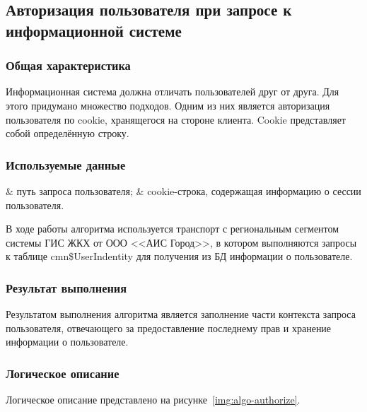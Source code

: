 \subsection{Авторизация пользователя при запросе к информационной системе}

\subsubsection*{Общая характеристика}

Информационная система должна отличать пользователей друг от друга.
Для этого придумано множество подходов.
Одним из них является авторизация пользователя по cookie, хранящегося на стороне клиента.
Cookie представляет собой определённую строку.

\subsubsection*{Используемые данные}

\begin{easylist}
& путь запроса пользователя;
& cookie-строка, содержащая информацию о сессии пользователя.
\end{easylist}

В ходе работы алгоритма используется транспорт с региональным сегментом системы ГИС ЖКХ от ООО <<АИС Город>>, в котором выполняются запросы к таблице cmn\$UserIndentity для получения из БД информации о пользователе.

\subsubsection*{Результат выполнения}

Результатом выполнения алгоритма является заполнение части контекста запроса пользователя, отвечающего за предоставление последнему прав и хранение информации о пользователе.

\subsubsection*{Логическое описание}

Логическое описание представлено на рисунке~\ref{img:algo-authorize}.

